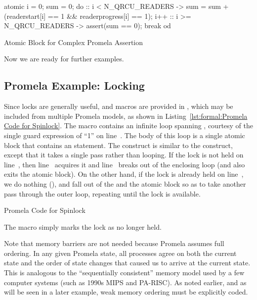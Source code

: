\begin{listing}
\begin{VerbatimL}
atomic {
	i = 0;
	sum = 0;
	do
	:: i < N_QRCU_READERS ->
		sum = sum + (readerstart[i] == 1 &&
		             readerprogress[i] == 1);
		i++
	:: i >= N_QRCU_READERS ->
		assert(sum == 0);
		break
	od
}
\end{VerbatimL}
\caption{Atomic Block for Complex Promela Assertion}
\label{lst:formal:Atomic Block for Complex Promela Assertion}
\end{listing}

Now we are ready for further examples.

\subsection{Promela Example: Locking}
\label{sec:formal:Promela Example: Locking}

\begin{fcvref}
Since locks are generally useful,  and
macros are provided in , which may be included from
multiple Promela models, as shown in
Listing~\ref{lst:formal:Promela Code for Spinlock}.
The  macro contains an infinite  loop
spanning ,
courtesy of the single guard expression of ``1'' on line~.
The body of this loop is a single atomic block that contains
an  statement.
The  construct is similar to the  construct, except
that it takes a single pass rather than looping.
If the lock is not held on line~, then
line~ acquires it and
line~ breaks out of the enclosing  loop (and also exits
the atomic block).
On the other hand, if the lock is already held on line~,
we do nothing (), and fall out of the  and the
atomic block so as to take another pass through the outer
loop, repeating until the lock is available.
\end{fcvref}

\begin{listing}

\caption{Promela Code for Spinlock}
\label{lst:formal:Promela Code for Spinlock}
\end{listing}

The  macro simply marks the lock as no
longer held.

Note that memory barriers are not needed because Promela assumes
full ordering.
In any given Promela state, all processes agree on both the current
state and the order of state changes that caused us to arrive at
the current state.
This is analogous to the ``sequentially consistent'' memory model
used by a few computer systems (such as 1990s MIPS and PA-RISC).
As noted earlier, and as will be seen in a later example,
weak memory ordering must be explicitly coded.

